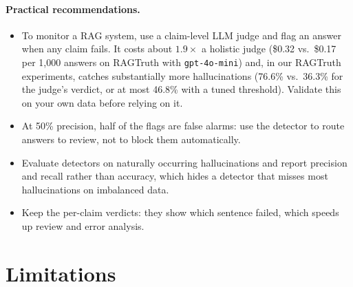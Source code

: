 \documentclass[11pt,a4paper]{article}
\newcommand{\code}[1]{\texttt{\small #1}}
\begin{document}
\paragraph{Practical recommendations.}
\begin{itemize}[leftmargin=*]
  \item To monitor a RAG system, use a claim-level LLM judge and flag an answer when
        any claim fails. It costs about $1.9\times$ a holistic judge (\$0.32 vs.\ \$0.17
        per 1{,}000 answers on RAGTruth with \code{gpt-4o-mini}) and, in our RAGTruth
        experiments, catches substantially more hallucinations (76.6\% vs.\ 36.3\% for
        the judge's verdict, or at most 46.8\% with a tuned threshold). Validate this on
        your own data before relying on it.
  \item At 50\% precision, half of the flags are false alarms: use the detector to
        route answers to review, not to block them automatically.
  \item Evaluate detectors on naturally occurring hallucinations and report precision
        and recall rather than accuracy, which hides a detector that misses most
        hallucinations on imbalanced data.
  \item Keep the per-claim verdicts: they show which sentence failed, which speeds up
        review and error analysis.
\end{itemize}

\section{Limitations}
\label{sec:limitations}
\end{document}
